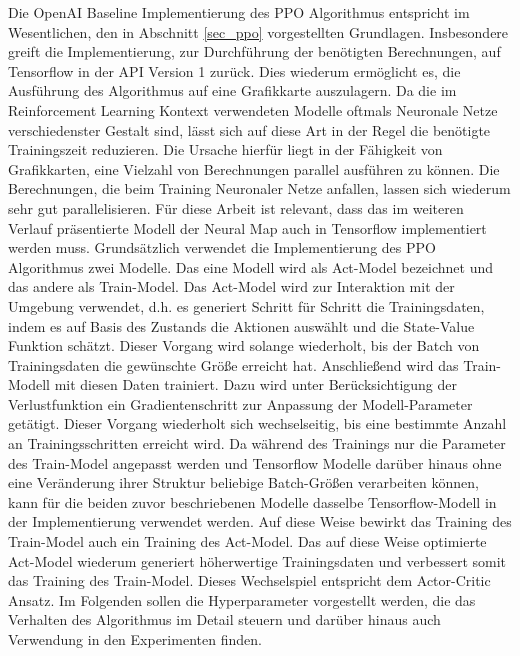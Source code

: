 Die OpenAI Baseline Implementierung des PPO Algorithmus entspricht im Wesentlichen, den in Abschnitt \ref{sec_ppo} vorgestellten Grundlagen. Insbesondere greift die Implementierung, zur Durchführung der benötigten Berechnungen, auf Tensorflow in der API Version 1 zurück. Dies wiederum ermöglicht es, die Ausführung des Algorithmus auf eine Grafikkarte auszulagern. Da die im Reinforcement Learning Kontext verwendeten Modelle oftmals Neuronale Netze verschiedenster Gestalt sind, lässt sich auf diese Art in der Regel die benötigte Trainingszeit reduzieren. Die Ursache hierfür liegt in der Fähigkeit von Grafikkarten, eine Vielzahl von Berechnungen parallel ausführen zu können. Die Berechnungen, die beim Training Neuronaler Netze anfallen, lassen sich wiederum sehr gut parallelisieren. Für diese Arbeit ist relevant, dass das im weiteren Verlauf präsentierte Modell der Neural Map auch in Tensorflow implementiert werden muss. Grundsätzlich verwendet die Implementierung des PPO Algorithmus zwei Modelle. Das eine Modell wird als Act-Model bezeichnet und das andere als Train-Model. Das Act-Model wird zur Interaktion mit der Umgebung verwendet, d.h. es generiert Schritt für Schritt die Trainingsdaten, indem es auf Basis des Zustands die Aktionen auswählt und die State-Value Funktion schätzt. Dieser Vorgang wird solange wiederholt, bis der Batch von Trainingsdaten die gewünschte Größe erreicht hat. Anschließend wird das Train-Modell mit diesen Daten trainiert. Dazu wird unter Berücksichtigung der Verlustfunktion ein Gradientenschritt zur Anpassung der Modell-Parameter getätigt. Dieser Vorgang wiederholt sich wechselseitig, bis eine bestimmte Anzahl an Trainingsschritten erreicht wird. Da während des Trainings nur die Parameter des Train-Model angepasst werden und Tensorflow Modelle darüber hinaus ohne eine Veränderung ihrer Struktur beliebige Batch-Größen verarbeiten können, kann für die beiden zuvor beschriebenen Modelle dasselbe Tensorflow-Modell in der Implementierung verwendet werden. Auf diese Weise bewirkt das Training des Train-Model auch ein Training des Act-Model. Das auf diese Weise optimierte Act-Model wiederum generiert höherwertige Trainingsdaten und verbessert somit das Training des Train-Model. Dieses Wechselspiel entspricht dem Actor-Critic Ansatz. Im Folgenden sollen die Hyperparameter vorgestellt werden, die das Verhalten des Algorithmus im Detail steuern und darüber hinaus auch Verwendung in den Experimenten finden.

